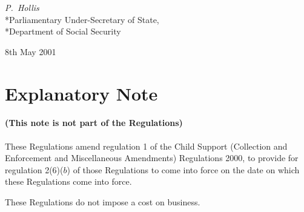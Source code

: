 \documentclass[12pt,a4paper]{article}
\begin{document}
{\raggedleft
\emph{P.~Hollis}\\*Parliamentary Under-Secretary of State,\\*Department of Social Security

}

8th May 2001

\small

\part{Explanatory Note}

\renewcommand\parthead{— Explanatory Note}

\subsection*{(This note is not part of the Regulations)}

These Regulations amend regulation 1 of the Child Support (Collection and Enforcement and Miscellaneous Amendments) Regulations 2000, to provide for regulation 2(6)($b$)  of those Regulations to come into force on the date on which these Regulations come into force.

These Regulations do not impose a cost on business. 
\end{document}
